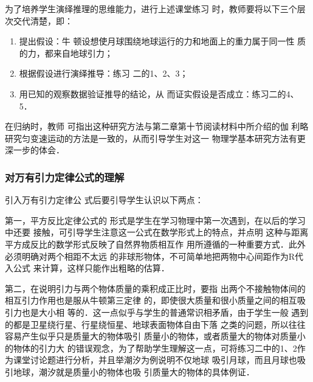 为了培养学生演绎推理的思维能力，进行上述课堂练习
时，教师要将以下三个层次交代清楚，即：
\begin{enumerate}
    \item 提出假设：牛
顿设想使月球围绕地球运行的力和地面上的重力属于同一性
质的力，都来自地球引力；
\item 根据假设进行演绎推导：练习
二的1、2、3；
\item 用已知的观察数据验证推导的结论，从
而证实假设是否成立：练习二的4、5．
\end{enumerate}

在归纳时，教师
可指出这种研究方法与第二章第十节阅读材料中所介绍的伽
利略研究匀变速运动的方法是一致的，从而引导学生对这一
物理学基本研究方法有更深一步的体会．

\subsubsection{对万有引力定律公式的理解}

引入万有引力定律公
式后要引导学生认识以下两点：

第一，平方反比定律公式的
形式是学生在学习物理中第一次遇到，在以后的学习中还要
接触，可引导学生注意这一公式在数学形式上的特点，并点明
这种与距离平方成反比的数学形式反映了自然界物质相互作
用所遵循的一种重要方式．此外必须明确对两个相距不太远
的非球形物体，不可简单地把两物中心间距作为R代入公式
来计算，这样只能作出粗略的估算．

第二，在说明引力与两个物体质量的乘积成正比时，要指
出两个不接触物体间的相互引力作用也是服从牛顿第三定律
的，即使很大质量和很小质量之间的相互吸引力也是大小相
等的．这一点似乎与学生的普通常识相矛盾，由于学生一般
遇到的都是卫星绕行星、行星绕恒星、地球表面物体自由下落
之类的问题，所以往往容易产生似乎只是质量大的物体吸引
质量小的物体，或者质量大的物体对质量小的物体的引力大
的错误观念，为了帮助学生理解这一点，可将练习二中的1、2作为课堂讨论题进行分析，并且举潮汐为例说明不仅地球
吸引月球，而且月球也吸引地球，潮汐就是质量小的物体也吸
引质量大的物体的具体例证．

